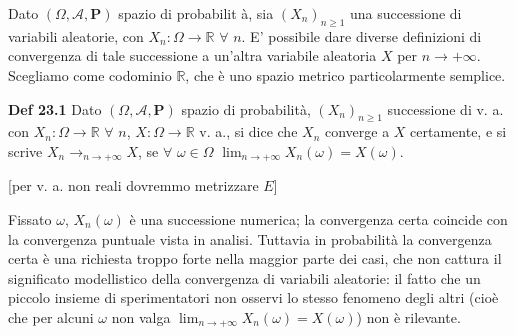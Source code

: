 \documentclass{article}
\begin{document}
Dato $\left( \Omega ,\mathcal{A},\mathbf{P}\right) $ spazio di probabilit%
\`{a}, sia $\left( X_{n}\right) _{n\geq 1}$ una successione di variabili
aleatorie, con $X_{n}:\Omega \rightarrow 
\mathbb{R}
$ $\forall $ $n$. E' possibile dare diverse definizioni di convergenza di
tale successione a un'altra variabile aleatoria $X$ per $n\rightarrow
+\infty $. Scegliamo come codominio $%
\mathbb{R}
$, che \`{e} uno spazio metrico particolarmente semplice.

\textbf{Def 23.1} Dato $\left( \Omega ,\mathcal{A},\mathbf{P}\right) $
spazio di probabilit\`{a}, $\left( X_{n}\right) _{n\geq 1}$ successione di
v. a. con $X_{n}:\Omega \rightarrow 
\mathbb{R}
$ $\forall $ $n$, $X:\Omega \rightarrow 
\mathbb{R}
$ v. a., si dice che $X_{n}$ converge a $X$ certamente, e si scrive $%
X_{n}\rightarrow _{n\rightarrow +\infty }X$, se $\forall $ $\omega \in
\Omega $ $\lim_{n\rightarrow +\infty }X_{n}\left( \omega \right) =X\left(
\omega \right) $.

[per v. a. non reali dovremmo metrizzare $E$]

Fissato $\omega $, $X_{n}\left( \omega \right) $ \`{e} una successione
numerica; la convergenza certa coincide con la convergenza puntuale vista in
analisi. Tuttavia in probabilit\`{a} la convergenza certa \`{e} una
richiesta troppo forte nella maggior parte dei casi, che non cattura il
significato modellistico della convergenza di variabili aleatorie: il fatto
che un piccolo insieme di sperimentatori non osservi lo stesso fenomeno
degli altri (cio\`{e} che per alcuni $\omega $ non valga $\lim_{n\rightarrow
+\infty }X_{n}\left( \omega \right) =X\left( \omega \right) $) non \`{e}
rilevante.
\end{document}
